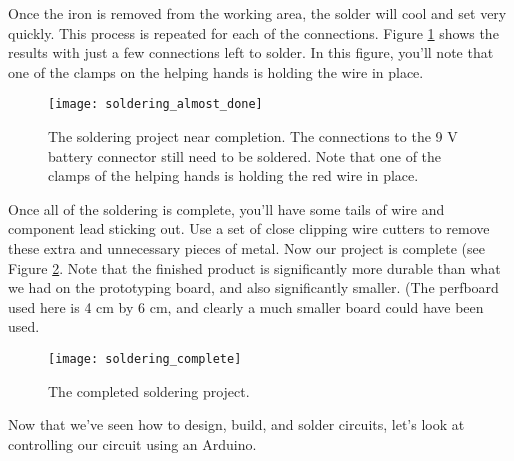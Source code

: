 Once the iron is removed from the working area, the solder will cool and set
very quickly.
This process is repeated for each of the
connections. Figure \ref{fig:soldering_almost_done} shows the results with just
a few connections left to solder. In this figure, you'll note that one of the
clamps on the helping hands is holding the wire in place.
\begin{figure}[htbp!]
\centering
\texttt{[image: soldering\_almost\_done]}
\caption[Soldering project near completion]{The soldering project near 
completion. The connections to the 9 V battery connector still need to be
soldered. Note that one of the clamps of the helping hands is holding the red
wire in place.}
\label{fig:soldering_almost_done}
\end{figure}

Once all of the soldering is complete, you'll have some tails of wire and
component lead sticking out. Use a set of close clipping wire cutters to remove
these extra and unnecessary pieces of metal. Now our project is complete
(see Figure \ref{fig:soldering_complete}. Note that the finished product is
significantly more durable than what we had on the prototyping board, and also
significantly smaller. (The perfboard used here is 4 cm by 6 cm, and clearly a much smaller board could have been used.

\begin{figure}[htbp!]
\centering
\texttt{[image: soldering\_complete]}
\caption[The completed soldering project]{The completed soldering project.}
\label{fig:soldering_complete}
\end{figure}


Now that we've seen how to design, build, and solder circuits, let's look at
controlling our circuit using an Arduino.








